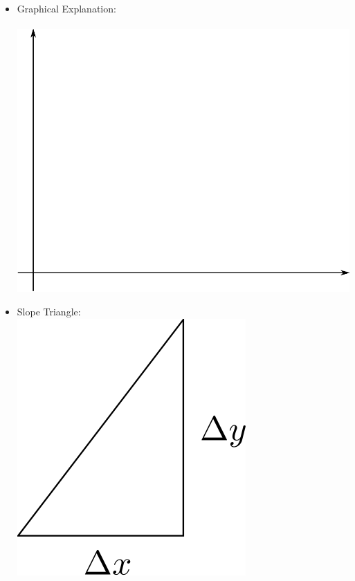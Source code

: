 \documentclass[11pt]{article}
\begin{document}
\begin{itemize}
\begin{itemize}
		\item \LARGE{Graphical Explanation:} \\\\
		\includegraphics[scale=.5]{lecture2_fig1.png}\\
		\item \LARGE{Slope Triangle:} \\
		\includegraphics[scale=.5]{lecture2_fig2.png}
		

\end{itemize}
\end{itemize}
\end{document}
